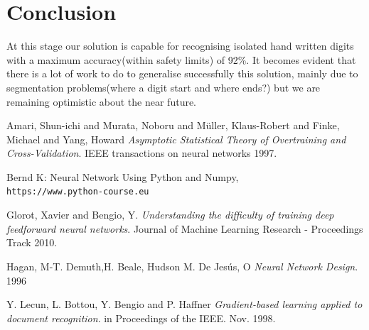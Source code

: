 \documentclass{proc}
\begin{document}
	\section{Conclusion}
	At this stage our solution is capable for recognising isolated hand written digits with a maximum accuracy(within safety limits) of 92\%. It becomes evident that there is a lot of work to do to generalise successfully this solution, mainly due to segmentation problems(where a digit start and where ends?) but we are remaining optimistic about the near future.
	\begin{thebibliography}{9}
		Amari, Shun-ichi and Murata, Noboru and Müller, Klaus-Robert and Finke, Michael and Yang, Howard 
		\textit{Asymptotic Statistical Theory of Overtraining and Cross-Validation}. 
		IEEE transactions on neural networks 1997.
		
		Bernd K: Neural Network Using Python and Numpy,
		\\\texttt{https://www.python-course.eu}
		
		Glorot, Xavier and Bengio, Y. 
		\textit{Understanding the difficulty of training deep feedforward neural networks}. 
		Journal of Machine Learning Research - Proceedings Track 2010.
		
		Hagan, M-T. Demuth,H. Beale, Hudson M. De Jesús, O
		\textit{Neural Network Design}.
		1996
		
		Y. Lecun, L. Bottou, Y. Bengio and P. Haffner
		\textit{Gradient-based learning applied to document recognition}.
		in Proceedings of the IEEE. Nov. 1998.
		
	\end{thebibliography}

	
\end{document}
